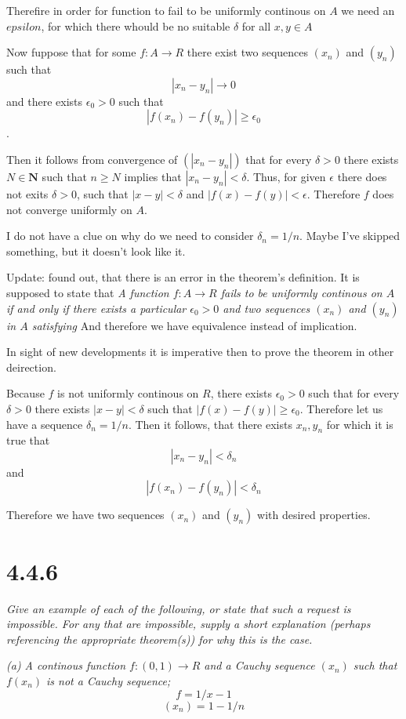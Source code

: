 \documentclass[11pt,oneside,titlepage]{book}
\begin{document}
Therefire in order for function to fail to be uniformly continous on $A$ we
need an $epsilon$, for which there whould be no suitable $\delta$ for all
$x, y \in A$

Now fuppose that for some $f: A \to R$ there exist two sequences $(x_n)$ and
$(y_n)$ such that
$$|x_n - y_n| \to 0$$
and there exists $\epsilon_0 > 0$ such that 
$$|f(x_n) - f(y_n)| \geq \epsilon_0$$.

Then it follows from convergence of $(|x_n - y_n|)$ that
for every $\delta > 0$ there exists
$N \in \textbf{N}$ such that $n \geq N$ implies
that $|x_n - y_n| < \delta$. Thus, for given $\epsilon$ there does not
exits $\delta > 0$, such that $|x - y| < \delta$ and
$|f(x) - f(y)| < \epsilon$. Therefore $f$ does not converge uniformly on
$A$.

I do not have a clue on why do we need to consider $\delta_n = 1/n$. Maybe I've
skipped something, but it doesn't look like it.

Update: found out, that there is an error in the theorem's definition. It
is supposed to state that
\textit{A function $f: A \to R$ fails to be uniformly continous on $A$ if
  and only if
  there exists a particular $\epsilon_0 > 0$ and two sequences $(x_n)$ and
  $(y_n)$ in $A$ satisfying}
And therefore we have equivalence instead of implication.

In sight of new developments it is imperative then to prove the
theorem in other deirection.

Because $f$ is not uniformly continous on $R$, there exists $\epsilon_0 > 0$
such that for every $\delta > 0$ there exists $|x - y| < \delta$ such that
$|f(x) - f(y)| \geq \epsilon_0$. Therefore let us have a sequence
$\delta_n = 1/n$. Then it follows, that there exists $x_n, y_n$ for which it
is true that
$$|x_n - y_n| < \delta_n$$
and
$$|f(x_n) - f(y_n)| < \delta_n$$

Therefore we have two sequences $(x_n)$ and $(y_n)$ with desired properties.


\section*{4.4.6}
\textit{Give an example of each of the following, or state that such a request is impossible. For any that are impossible, supply a short explanation (perhaps referencing the appropriate theorem(s)) for why this is the case.}

\textit{(a) A continous function $f: (0, 1) \to R$ and a Cauchy sequence
  $(x_n)$ such that $f(x_n)$ is not a Cauchy sequence;}
$$f = 1 / x - 1$$
$$(x_n) = 1 - 1/n$$
\end{document}
